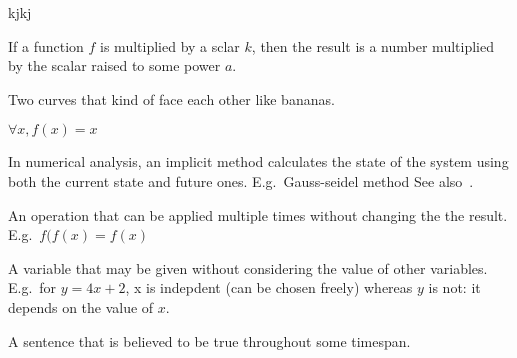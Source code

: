 \begin{definition}
    kjkj
\end{definition}

\begin{definition}[Homogenous]
    If a function $f$ is multiplied by a sclar $k$, then the result
    is a number multiplied by the scalar raised to some power $a$.
\end{definition}

\begin{definition}[Hyperbolic]
    Two curves that kind of face each other like bananas.
\end{definition}

\begin{definition}
    $\forall{x}, f(x) = x$
\end{definition}

\begin{definition}\label{implicitmethod}
    In numerical analysis, an implicit method calculates the state of the system
    using both the current state and future ones. E.g.\ Gauss-seidel method
    See also~.
\end{definition}

\begin{definition}[Idempotence]
    An operation that can be applied multiple times without changing the
    the result. E.g.\ $f(f(x) = f(x)$
\end{definition}

\begin{definition}
    A variable that may be given without considering the value of other
    variables. E.g.\ for $y = 4x + 2$, x is indepdent (can be chosen freely)
    whereas $y$ is not: it depends on the value of $x$.
\end{definition}

\begin{definition}[Invariant]
    A sentence that is believed to be true throughout some timespan.
\end{definition}

